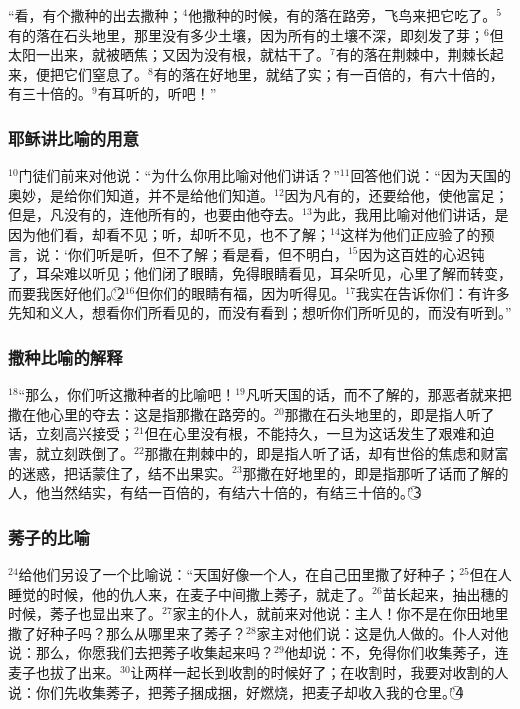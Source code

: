 “看，有个撒种的出去撒种；$^{4}$他撒种的时候，有的落在路旁，飞鸟来把它吃了。$^{5}$有的落在石头地里，那里没有多少土壤，因为所有的土壤不深，即刻发了芽；$^{6}$但太阳一出来，就被晒焦；又因为没有根，就枯干了。$^{7}$有的落在荆棘中，荆棘长起来，便把它们窒息了。$^{8}$有的落在好地里，就结了实；有一百倍的，有六十倍的，有三十倍的。$^{9}$有耳听的，听吧！”


\subsubsection{耶稣讲比喻的用意}
$^{10}$门徒们前来对他说：“为什么你用比喻对他们讲话？”$^{11}$\UL[耶稣]回答他们说：“因为天国的奥妙，是给你们知道，并不是给他们知道。$^{12}$因为凡有的，还要给他，使他富足；但是，凡没有的，连他所有的，也要由他夺去。$^{13}$为此，我用比喻对他们讲话，是因为他们看，却看不见；听，却听不见，也不了解；$^{14}$这样为他们正应验了\UL[依撒意亚]的预言，说：‘你们听是听，但不了解；看是看，但不明白，$^{15}$因为这百姓的心迟钝了，耳朵难以听见；他们闭了眼睛，免得眼睛看见，耳朵听见，心里了解而转变，而要我医好他们。’\textcircled{2}$^{16}$但你们的眼睛有福，因为听得见。$^{17}$我实在告诉你们：有许多先知和义人，想看你们所看见的，而没有看到；想听你们所听见的，而没有听到。”


\subsubsection{撒种比喻的解释}
$^{18}$“那么，你们听这撒种者的比喻吧！$^{19}$凡听天国的话，而不了解的，那恶者就来把撒在他心里的夺去：这是指那撒在路旁的。$^{20}$那撒在石头地里的，即是指人听了话，立刻高兴接受；$^{21}$但在心里没有根，不能持久，一旦为这话发生了艰难和迫害，就立刻跌倒了。$^{22}$那撒在荆棘中的，即是指人听了话，却有世俗的焦虑和财富的迷惑，把话蒙住了，结不出果实。$^{23}$那撒在好地里的，即是指那听了话而了解的人，他当然结实，有结一百倍的，有结六十倍的，有结三十倍的。”\textcircled{3}


\subsubsection{莠子的比喻}
$^{24}$\UL[耶稣]给他们另设了一个比喻说：“天国好像一个人，在自己田里撒了好种子；$^{25}$但在人睡觉的时候，他的仇人来，在麦子中间撒上莠子，就走了。$^{26}$苗长起来，抽出穗的时候，莠子也显出来了。$^{27}$家主的仆人，就前来对他说：主人！你不是在你田地里撒了好种子吗？那么从哪里来了莠子？$^{28}$家主对他们说：这是仇人做的。仆人对他说：那么，你愿我们去把莠子收集起来吗？$^{29}$他却说：不，免得你们收集莠子，连麦子也拔了出来。$^{30}$让两样一起长到收割的时候好了；在收割时，我要对收割的人说：你们先收集莠子，把莠子捆成捆，好燃烧，把麦子却收入我的仓里。”\textcircled{4}


